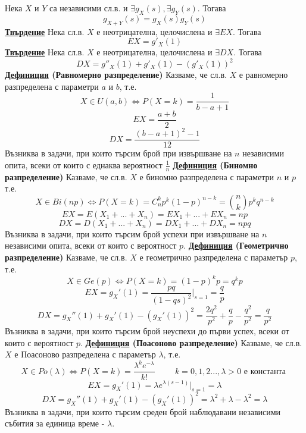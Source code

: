 \documentclass{article}
\begin{document}
Нека $X$ и $Y$ са независими сл.в. и $\exists g_X(s), \exists g_Y(s)$. Тогава
$$g_{X+Y}(s) = g_X(s)g_Y(s)$$
\textbf{\underline{Твърдение}} \newline
Нека сл.в. $X$ е неотрицателна, целочислена и $\exists EX$. Тогава $$EX = g'_X(1)$$
\textbf{\underline{Твърдение}} \newline
Нека сл.в. $X$ е неотрицателна, целочислена и $\exists DX$. Тогава $$DX = g''_X(1) + g'_X(1) - (g'_X(1))^2$$
\textbf{\underline{Дефиниция} (Равномерно разпределение)} \newline\newline
Казваме, че сл.в. $X$ е равномерно разпределена с параметри $a$ и $b$, т.е. $$X \in U(a, b) \iff P(X = k) = \frac{1}{b - a + 1}$$
$$EX = \frac{a + b}{2}$$
$$DX = \frac{(b - a + 1)^2 - 1}{12}$$
Възниква в задачи, при които търсим брой при извършване на $n$ независими опита, всеки от които с еднаква вероятност $\frac{1}{n}$ \newline\newline
\textbf{\underline{Дефиниция} (Биномно разпределение)} \newline\newline
Казваме, че сл.в. $X$ е биномно разпределена с параметри $n$ и $p$ т.е. $$X \in Bi(n p) \iff P(X = k) = C_{n}^kp^k(1 - p)^{n-k} =
\binom{n}{k}p^kq^{n-k}$$
$$EX = E(X_1 + ... + X_n) = EX_1 + ... + EX_n = np$$
$$DX = D(X_1 + ... + X_n) = DX_1 + ... + DX_n = npq$$
Възниква в задачи, при които търсим брой успехи при извършване на $n$ независими опита, всеки от които с вероятност $p$. \newline\newline
\textbf{\underline{Дефиниция} (Геометрично разпределение)} \newline\newline
Казваме, че сл.в. $X$ е геометрично разпределена с параметър $p$, т.е. $$X \in Ge(p) \iff P(X = k) = (1 - p)^{k}p = q^{k}p$$
$$EX = g_X'(1) = \frac{pq}{(1 - qs)^2}\vert_{s=1} = \frac{q}{p}$$
$$DX = g_X''(1) + g_X'(1) - (g_X'(1))^2 = \frac{2q^2}{p^2} + \frac{q}{p} - \frac{q^2}{p^2} = \frac{q}{p^2}$$
Възниква в задачи, при които търсим брой неуспехи до първи успех, всеки от които с вероятност $p$. \newline\newline
\textbf{\underline{Дефиниция} (Поасоново разпределение)} \newline
Казваме, че сл.в. $X$ е Поасоново разпределена с параметър $\lambda$, т.е. $$X \in Po(\lambda) \iff P(X = k) =
\frac{\lambda^ke^{-\lambda}}{k!} \hspace{1cm} k = 0,1,2..., \lambda > 0 \text{ е константа }$$
$$EX = g_X'(1) = \lambda e^{\lambda(s-1)}\vert_{s=1} = \lambda$$
$$DX = g_X''(1) + g_X'(1) - (g_X'(1))^2 = \lambda^2 + \lambda - \lambda^2 = \lambda$$
Възниква в задачи, при които търсим среден брой наблюдавани независими събития за единица време - $\lambda$. \newline\newline
\end{document}
